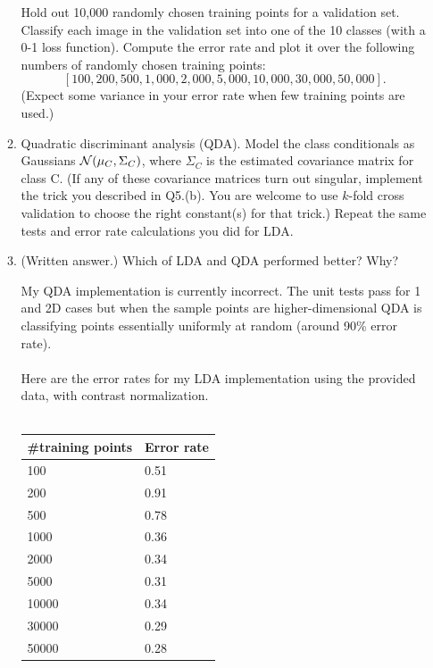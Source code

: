 \begin{enumerate}[label=(\alph*)]
\begin{enumerate}[label=(\roman*)]
        Hold out 10,000 randomly chosen training points for a validation set. Classify each image in the validation set into one of the 10 classes (with a 0-1 loss function). Compute the error rate and plot it over the following numbers of randomly chosen training points: $$[100, 200, 500, 1,000, 2,000, 5,000, 10,000, 30,000, 50,000].$$ (Expect some variance in your error rate when few training points are used.)

        \item Quadratic discriminant analysis (QDA). Model the class conditionals as Gaussians $\mathcal{N}(\mu_C, \Sigma_C)$, where $\Sigma_C$ is the estimated covariance matrix for class C. (If any of these covariance matrices turn out singular, implement the trick you described in Q5.(b). You are welcome to use $k$-fold cross validation to choose the right constant(s) for that trick.) Repeat the same tests and error rate calculations you did for LDA.

        \item  (Written answer.) Which of LDA and QDA performed better? Why?
        \begin{mdframed}
          My QDA implementation is currently incorrect. The unit tests pass for
          1 and 2D cases but when the sample points are higher-dimensional QDA
          is classifying points essentially uniformly at random (around 90\%
          error rate).
          \\\\
          Here are the error rates for my LDA implementation using the provided
          data, with contrast normalization.
          \\\\
          \begin{tabular}{l|l}
            \#{training points}&Error rate\\
            \hline
            100 & 0.51\\
            200 & 0.91\\
            500 & 0.78\\
            1000 & 0.36\\
            2000 & 0.34\\
            5000 & 0.31\\
            10000 & 0.34\\
            30000 & 0.29\\
            50000 & 0.28\\
          \end{tabular}
        \end{mdframed}


\end{enumerate}
\end{enumerate}
